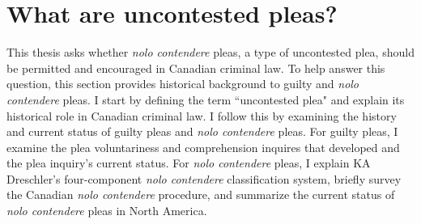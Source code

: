 \chapter{What are uncontested pleas?}

This thesis asks whether \textit{nolo contendere} pleas, a type of uncontested plea, should be permitted and encouraged in Canadian criminal law. To help answer this question, this section provides historical background to guilty and \textit{nolo contendere} pleas. I start by defining the term ``uncontested plea" and explain its historical role in Canadian criminal law. I follow this by examining the history and current status of guilty pleas and \textit{nolo contendere} pleas. For guilty pleas, I examine the plea voluntariness and comprehension inquires that developed and the plea inquiry's current status. For \textit{nolo contendere} pleas, I explain KA Dreschler's four-component \textit{nolo contendere} classification system, briefly survey the Canadian \textit{nolo contendere} procedure, and summarize the current status of \textit{nolo contendere} pleas in North America.

